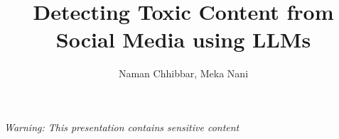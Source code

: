 \documentclass{beamer}
\title{Detecting Toxic Content from Social Media using LLMs}
\author[Naman Chhibbar \\ Meka Nani]{Naman Chhibbar, Meka Nani}
\institute{Indian Institute of Technology Hyderabad}
\date{}
\begin{document}
\begin{frame}
  \titlepage
  \centering
  \textit{\scriptsize Warning: This presentation contains sensitive content}
\end{frame}




% 
% 




\end{document}
